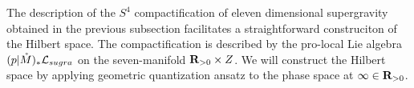 



%
%
%
%
%
\parsec[s:hilbertspace]
The description of the $S^{4}$ compactification of eleven dimensional supergravity obtained in the previous subsection facilitates a straightforward construciton of the Hilbert space. The compactification is described by the pro-local Lie algebra $(p|\mathring M)_{*} \mathcal L_{sugra}$ on the seven-manifold $\mathbf{R}_{>0}\times Z$. We will construct the Hilbert space by applying geometric quantization ansatz to the phase space at $\infty \in \mathbf{R}_{>0}$.

